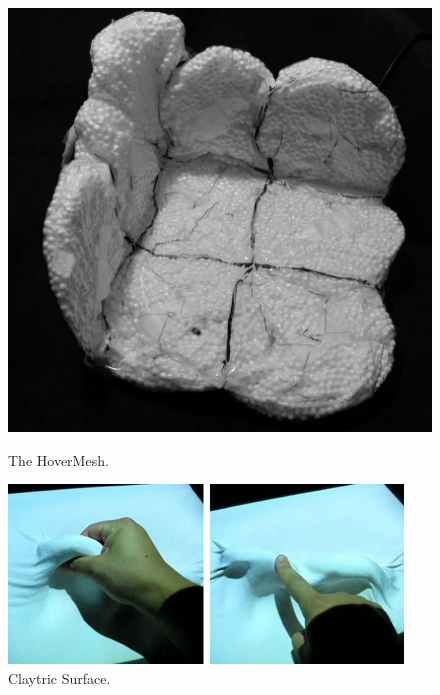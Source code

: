 \begin{figure}
  \centering
  \begin{minipage}[t]{.4\textwidth}
    \centering
    \includegraphics[width=.9\linewidth]{figures/jamming/hovermesh}
    \caption[The HoverMesh by \citet{mazzone2004hovermesh}.]
    {The HoverMesh.}
    \label{fig:ch:jamming:hovermesh}
  \end{minipage}%
  \hspace{0.5cm}
  \begin{minipage}[t]{.4\textwidth}
    \centering
    \includegraphics[width=.9\linewidth]{figures/jamming/claytric-surface}
    \caption[Claytric Surface by \citet{matoba2012claytricsurface}.]
    {Claytric Surface.}
    \label{fig:ch:jamming:claytric-surface}
  \end{minipage}
\end{figure}

